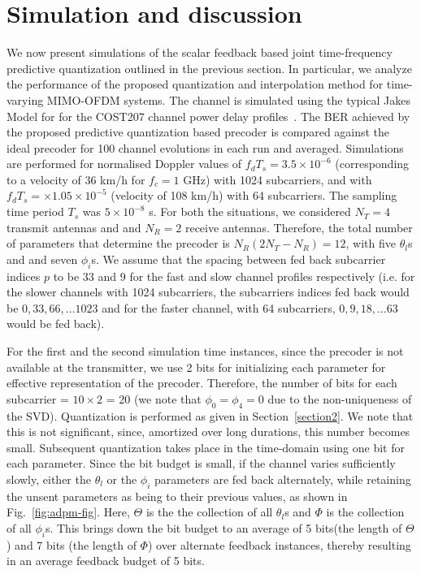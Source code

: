 \documentclass[journal,10pt,twocolumn]{IEEEtran}
\begin{document}
\section{Simulation and discussion}
\label{section3}
We now present simulations of the scalar feedback based joint
time-frequency predictive quantization outlined in the previous
section. In particular, we analyze the performance of the proposed
quantization and interpolation method for time-varying MIMO-OFDM
systems. The channel is simulated using the typical Jakes Model for
for the COST207 channel power delay
profiles~\cite{molisch2006cost259,cost1989cost}. The BER achieved by
the proposed predictive quantization based precoder is compared
against the ideal precoder for 100 channel evolutions in each run and
averaged. Simulations are performed for normalised Doppler values of
$f_dT_s = 3.5\times 10^{-6}$ (corresponding to a velocity of 36 km/h
for $f_c = 1$ GHz) with 1024 subcarriers, and with
$f_dT_s = \times 1.05 \times 10^{-5}$ (velocity of 108 km/h) with 64
subcarriers. The sampling time period $T_s$ was $5\times10^{-8}$
s. For both the situations, we considered $N_T=4$ transmit antennas
and and $N_R=2$ receive antennas. Therefore, the total number of
parameters that determine the precoder is
$N_{R}(2N_{T} - N_{R}) = 12$, with five $\theta_l$s and and seven
$\phi_i$s. We assume that the spacing between fed back subcarrier
indices $p$ to be $33$ and $9$ for the fast and slow channel profiles
respectively (i.e. for the slower channels with 1024 subcarriers, the
subcarriers indices fed back would be $0, 33, 66, \ldots 1023$ and for
the faster channel, with 64 subcarriers, $0, 9, 18, \ldots 63$ would
be fed back).

For the first and the second simulation time instances, since the
precoder is not available at the transmitter, we use 2 bits for
initializing each parameter for effective representation of the
precoder. Therefore, the number of bits for each subcarrier =
$10\times 2$ = 20 (we note that $\phi_0 = \phi_4 = 0$ due to the
non-uniqueness of the SVD). Quantization is performed as given in
Section~\ref{section2}. We note that this is not significant, since,
amortized over long durations, this number becomes small. Subsequent
quantization takes place in the time-domain using one bit for each
parameter. Since the bit budget is small, if the channel varies
sufficiently slowly, either the $\theta_l$ or the $\phi_i$ parameters
are fed back alternately, while retaining the unsent parameters as
being to their previous values, as shown in
Fig.~\ref{fig:adpm-fig}. Here, $\Theta$ is the the collection of all
$\theta_l$s and $\Phi$ is the collection of all $\phi_i$s. This brings
down the bit budget to an average of 5 bits(the length of $\Theta$)
and 7 bits (the length of $\Phi$) over alternate feedback instances,
thereby resulting in an average feedback budget of 5 bits.
\end{document}
